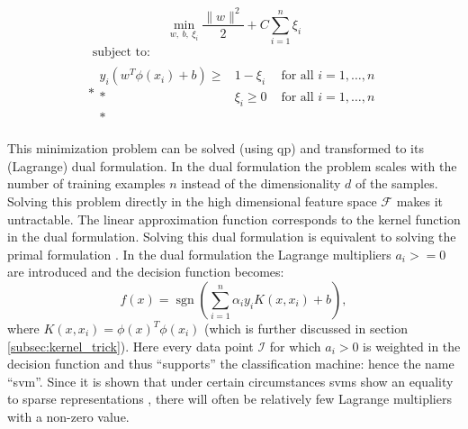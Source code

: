 \begin{equation}\label{eq:svm_objective}
  \operatorname*{min}_{w,\ b,\ \xi_i} \frac{ \lVert{w}\rVert^2 }{2} + C \sum_{i=1}^n \xi_i
\end{equation}
\begin{equation}
  \begin{multlined}
  \mbox{ subject to: } \\*
  \begin{aligned}
  y_i( w^T \phi(x_i) + b) \geq & 1 - \xi_i & \mbox{ for all } i = 1, \dots, n \\*
   & \xi_i \geq 0 & \mbox{ for all } i = 1, \dots, n\\*
  \end{aligned}
  \end{multlined}
\end{equation}


This minimization problem can be solved (using \gls{qp}) and transformed to its (Lagrange) dual formulation.
In the dual formulation the problem scales with the number of training examples $n$ instead of the dimensionality $d$ of the samples.
Solving this problem directly in the high dimensional feature space $\mathcal{F}$ makes it untractable.
The linear approximation function corresponds to the kernel function in the dual formulation.
Solving this dual formulation is equivalent to solving the primal formulation \cite{cherkassky2007learning}.
In the dual formulation the Lagrange multipliers $a_i >= 0$ are introduced and the decision function becomes:
\begin{equation}\label{eq:svm_lagrange}
  f(x) = \operatorname{sgn}( \sum_{i=1}^n \alpha_i y_i K(x, x_i) + b),
\end{equation}
where $K(x, x_i) = \phi(x)^T\phi(x_i)$ (which is further discussed in section \ref{subsec:kernel_trick}).
Here every data point $\mathcal{I}$ for which $a_i > 0$ is weighted in the decision function and thus ``supports'' the classification machine: hence the name ``\acrlong{svm}''.
Since it is shown that under certain circumstances \glspl{svm} show an equality to sparse representations \cite{girosi1998equivalence,smola1998connection}, there will often be relatively few Lagrange multipliers with a non-zero value.


